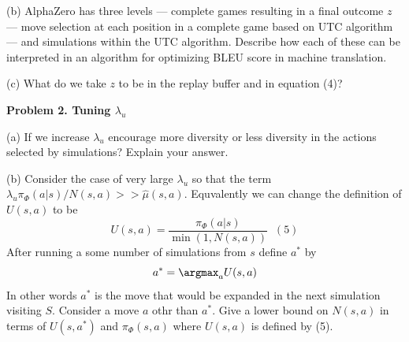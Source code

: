 \documentclass{article}
\newcommand{\solution}[1]{}
\begin{document}
\medskip
(b) AlphaZero has three levels --- complete games resulting in a final outcome $z$ --- move selection at each position in a complete game based on UTC algorithm ---
and simulations within the UTC algorithm.  Describe how each of these can be interpreted in an algorithm for optimizing BLEU score in machine translation.

\solution{
  A ``complete game'' consists of selecting a move (word) at each position in the game ending one specific translation.

  \medskip
  Move selection corresponds to selecting the next word using athe UCT tree search algorithm.

  \medskip
  We can use the same simulation algorithm as in AlphaZero.  It might also be possible to let each simulation generate a full translation, although there is a danger of the simulation getting very deep.
}

\medskip
(c) What do we take $z$ to be in the replay buffer and in equation (4)?

\solution{$z$ should be taken to be the BLEU score of the final translation generated in the ``game''.}
  

\bigskip
{\bf Problem 2. Tuning $\lambda_u$}
    
\medskip
(a) If we increase $\lambda_u $ encourage more diversity or less diversity in the actions selected by simulations? Explain your answer.

\solution{
  Increasing $\lambda_u$ leads to more diversity because larger values of $\lambda_u$ cause $U(s,a)$ to decline
  as $N(s,a)$ increases leading to the simulation moving away from $a$ as $N(s,a)$ increases.
}

\medskip
(b) Consider the case of very large $\lambda_u$ so that the term $\lambda_u \pi_\Phi(a|s)/N(s,a) >> \hat{\mu}(s,a)$.  Equvalently we can change the definition
of $U(s,a)$ to be
$$U(s,a) = \frac{\pi_\Phi(a|s)}{\min(1,N(s,a))} \;\;(5)$$
After running a some number of simulations from $s$ define $a^*$ by
$$a^* = \argmax_a U(s,a)$$
In other words $a^*$ is the move that would be expanded in the next simulation visiting $S$.
Consider a move $a$ othr than $a^*$.  Give a lower bound on $N(s,a)$ in terms of $U(s,a^*)$ and $\pi_\Phi(s,a)$ where $U(s,a)$ is defined by (5).

\solution{
  \begin{eqnarray*}
    U(s,a^*) & \geq & U(s,a) \\
    \\
    U(s,a^*) & \geq & \frac{\pi_\Phi(a|s)}{N(s,a)} \\
    \\
    N(s,a) & \geq & \frac{\pi_\Phi(s|a)}{U(s,a^*)} \;\;\;(6)
  \end{eqnarray*}
  Note that (6) holds for all $a$.  So for very large $\lambda_u$ the number of simulations visiting an action $a$ is
  proportional to $\pi_\Phi(a|s)$ for some top $k$ actions.
}
\end{document}
